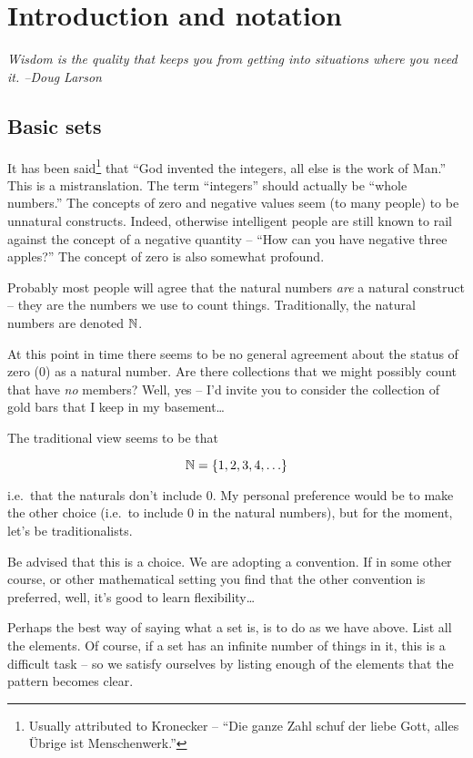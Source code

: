 
\chapter{Introduction and notation}
\label{ch:intro}

{\em Wisdom is the quality that keeps you from getting into situations where you need it.  --Doug Larson}

\section{Basic sets}
\label{sec:basic}

It has been said\footnote{Usually attributed to 
Kronecker -- ``Die ganze Zahl schuf der liebe Gott, alles \"{U}brige 
ist Menschenwerk.''} that ``God invented
the integers, all else is the work of Man.''  This is 
a mistranslation.  The term ``integers'' should
actually be ``whole numbers.''  The concepts of zero and negative 
values seem (to many people) to be unnatural constructs.  Indeed, otherwise
intelligent people are still known to rail against the concept of a
negative quantity -- ``How can you have negative three apples?'' 
The concept of zero is also somewhat profound.

Probably most people will agree that the 
 natural numbers {\em are} a natural construct -- they are the numbers we use to count things.  Traditionally, the natural numbers are denoted ${\mathbb N}$.

At this point in time there seems to be no general agreement about the status
of zero ($0$) as a natural number.  Are there collections that we might possibly
count that have \emph{no} members?  Well, yes -- I'd invite you to consider the collection of gold bars that I keep in my basement\ldots

The traditional view seems to be that 

\[ {\mathbb N} = \{1, 2, 3, 4, \ldots \} \]

\noindent i.e.\ that the naturals don't include 0.  My personal 
preference would be to make the other choice (i.e.\ to include $0$
in the natural numbers), but for the moment, let's be traditionalists.

\noindent Be advised that this is a choice.  We are adopting a 
convention.  If in some other course, or other mathematical setting 
you find that the other convention is preferred, well, it's good to
learn flexibility\ldots

Perhaps the best way of saying what a set is, is to do as we 
have above.  List all the elements.  Of course, if a set has an
infinite number of things in it, this is a difficult task -- so
we satisfy ourselves by listing enough of the elements that the
pattern becomes clear.

